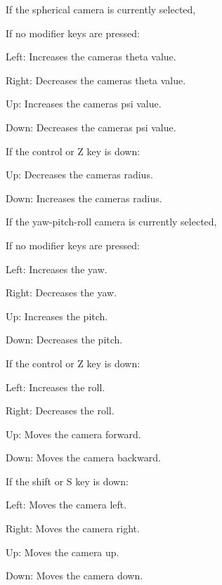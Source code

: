 If the spherical camera is currently selected,

If no modifier keys are pressed\+:


\begin{DoxyItemize}
\item Left\+: Increases the camera\textquotesingle{}s theta value.
\item Right\+: Decreases the camera\textquotesingle{}s theta value.
\item Up\+: Increases the camera\textquotesingle{}s psi value.
\item Down\+: Decreases the camera\textquotesingle{}s psi value.
\end{DoxyItemize}

If the control or Z key is down\+:


\begin{DoxyItemize}
\item Up\+: Decreases the camera\textquotesingle{}s radius.
\item Down\+: Increases the camera\textquotesingle{}s radius.
\end{DoxyItemize}

If the yaw-\/pitch-\/roll camera is currently selected,

If no modifier keys are pressed\+:


\begin{DoxyItemize}
\item Left\+: Increases the yaw.
\item Right\+: Decreases the yaw.
\item Up\+: Increases the pitch.
\item Down\+: Decreases the pitch.
\end{DoxyItemize}

If the control or Z key is down\+:


\begin{DoxyItemize}
\item Left\+: Increases the roll.
\item Right\+: Decreases the roll.
\item Up\+: Moves the camera forward.
\item Down\+: Moves the camera backward.
\end{DoxyItemize}

If the shift or S key is down\+:


\begin{DoxyItemize}
\item Left\+: Moves the camera left.
\item Right\+: Moves the camera right.
\item Up\+: Moves the camera up.
\item Down\+: Moves the camera down.
\end{DoxyItemize}

